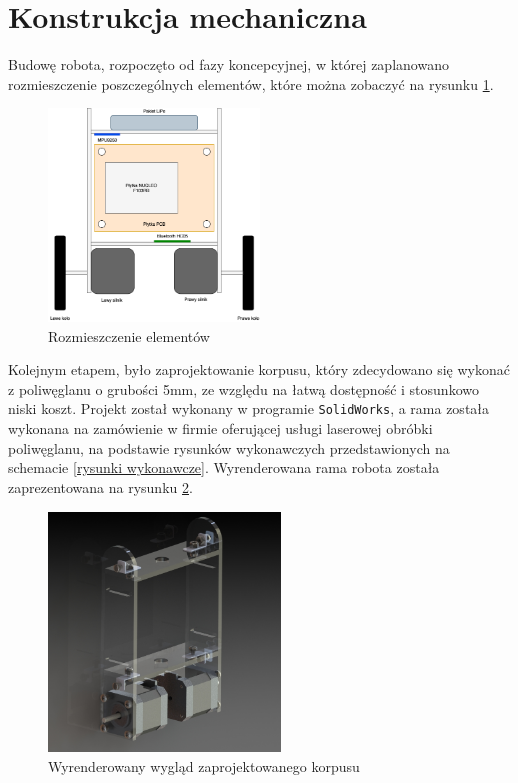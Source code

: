 \section{Konstrukcja mechaniczna}

Budowę robota, rozpoczęto od fazy koncepcyjnej, w której zaplanowano rozmieszczenie poszczególnych elementów, które można zobaczyć na rysunku \ref{Faza koncepcyjna}.

\begin{figure}[h!]
    \centering
    \includegraphics[width=0.5\textwidth]{Rysunki/Rozdzial05/Faza_koncepcyjna.png}
    \caption{Rozmieszczenie elementów}
    \label{Faza koncepcyjna}
\end{figure}

Kolejnym etapem, było zaprojektowanie korpusu, który zdecydowano się wykonać z poliwęglanu o grubości 5mm, ze względu na łatwą dostępność i stosunkowo niski koszt. Projekt został wykonany w programie \texttt{SolidWorks}, a rama została wykonana na zamówienie w firmie oferującej usługi laserowej obróbki poliwęglanu, na podstawie rysunków wykonawczych przedstawionych na schemacie \ref{rysunki wykonawcze}. Wyrenderowana rama robota została zaprezentowana na rysunku \ref{render}.

\begin{figure}[h!]
    \centering
    \includegraphics[width=0.55\textwidth]{Rysunki/Rozdzial05/rama.png}
    \caption{Wyrenderowany wygląd zaprojektowanego korpusu}
    \label{render}
\end{figure}

